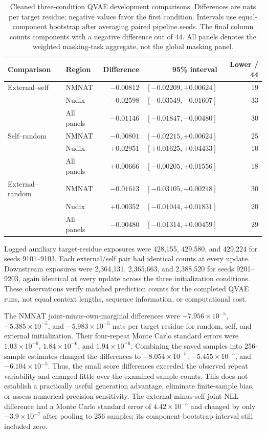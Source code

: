 \documentclass[referee,pdflatex,sn-vancouver-num]{sn-jnl}
\begin{document}
\begin{table}[ht]
\centering
\small
\caption{Cleaned three-condition QVAE development comparisons. Differences are nats per target residue; negative values favor the first condition. Intervals use equal-component bootstrap after averaging paired pipeline seeds. The final column counts components with a negative difference out of 44. All panels denotes the weighted masking-task aggregate, not the global masking panel.}\label{tab:controlled_regions}
\begin{tabular}{llrrr}
\toprule
Comparison & Region & Difference & 95\% interval & Lower / 44 \\
\midrule
External--self & NMNAT & $-0.00812$ & $[-0.02209,+0.00624]$ & 19 \\
 & Nudix & $-0.02598$ & $[-0.03549,-0.01607]$ & 33 \\
 & All panels & $-0.01146$ & $[-0.01847,-0.00480]$ & 30 \\
Self--random & NMNAT & $-0.00801$ & $[-0.02215,+0.00624]$ & 25 \\
 & Nudix & $+0.02951$ & $[+0.01625,+0.04433]$ & 10 \\
 & All panels & $+0.00666$ & $[-0.00205,+0.01556]$ & 18 \\
External--random & NMNAT & $-0.01613$ & $[-0.03105,-0.00218]$ & 30 \\
 & Nudix & $+0.00352$ & $[-0.01044,+0.01831]$ & 20 \\
 & All panels & $-0.00480$ & $[-0.01314,+0.00459]$ & 29 \\
\bottomrule
\end{tabular}
\end{table}

Logged auxiliary target-residue exposures were 428,155, 429,580, and 429,224 for seeds 9101--9103. Each external/self pair had identical counts at every update. Downstream exposures were 2,364,131, 2,365,663, and 2,388,520 for seeds 9201--9203, again identical at every update across the three initialization conditions. These observations verify matched prediction counts for the completed QVAE runs, not equal context lengths, sequence information, or computational cost.

The NMNAT joint-minus-own-marginal differences were $-7.956\times10^{-5}$, $-5.385\times10^{-5}$, and $-5.983\times10^{-5}$ nats per target residue for random, self, and external initialization. Their four-repeat Monte Carlo standard errors were $1.03\times10^{-6}$, $1.84\times10^{-6}$, and $1.94\times10^{-6}$. Combining the saved samples into 256-sample estimates changed the differences to $-8.054\times10^{-5}$, $-5.455\times10^{-5}$, and $-6.104\times10^{-5}$. Thus, the small score differences exceeded the observed repeat variability and changed little over the examined sample counts. This does not establish a practically useful generation advantage, eliminate finite-sample bias, or assess numerical-precision sensitivity. The external-minus-self joint NLL difference had a Monte Carlo standard error of $4.42\times10^{-5}$ and changed by only $-3.9\times10^{-7}$ after pooling to 256 samples; its component-bootstrap interval still included zero.
\end{document}
